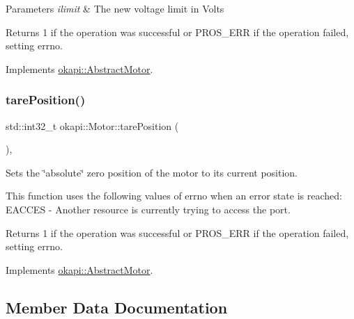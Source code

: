 \begin{DoxyParams}{Parameters}
{\em ilimit} & The new voltage limit in Volts \\
\hline
\end{DoxyParams}
\begin{DoxyReturn}{Returns}
1 if the operation was successful or P\+R\+O\+S\+\_\+\+E\+RR if the operation failed, setting errno. 
\end{DoxyReturn}


Implements \mbox{\hyperlink{classokapi_1_1AbstractMotor_a2f33faf946b99cd34e9a591ccc33d644}{okapi\+::\+Abstract\+Motor}}.

\mbox{\label{classokapi_1_1Motor_aa71f3d93b734caec5c9245b211d4a0ad}} 
\subsubsection{\texorpdfstring{tarePosition()}{tarePosition()}}
{\footnotesize\ttfamily std\+::int32\+\_\+t okapi\+::\+Motor\+::tare\+Position (\begin{DoxyParamCaption}{ }\end{DoxyParamCaption})\hspace{0.3cm}{\ttfamily [override]}, {\ttfamily [virtual]}}

Sets the \char`\"{}absolute\char`\"{} zero position of the motor to its current position.

This function uses the following values of errno when an error state is reached\+: E\+A\+C\+C\+ES -\/ Another resource is currently trying to access the port.

\begin{DoxyReturn}{Returns}
1 if the operation was successful or P\+R\+O\+S\+\_\+\+E\+RR if the operation failed, setting errno. 
\end{DoxyReturn}


Implements \mbox{\hyperlink{classokapi_1_1AbstractMotor_ac36edbc92db85a11adcfee56275de15b}{okapi\+::\+Abstract\+Motor}}.



\subsection{Member Data Documentation}
\mbox{\label{classokapi_1_1Motor_a98f1ccfe295ebc9c4dd268f44d5f7c42}} 
